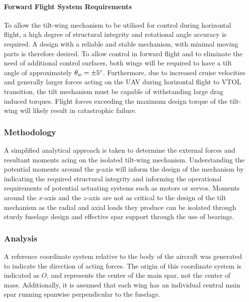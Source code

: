 \paragraph{Forward Flight System Requirements}
To allow the tilt-wing mechanism to be utilised for control during horizontal flight, a high degree of structural integrity and rotational angle accuracy is required. A design with a reliable and stable mechanism, with minimal moving parts is therefore desired. To allow control in forward flight and to eliminate the need of additional control surfaces, both wings will be required to have a tilt angle of approximately \(\theta_w=\pm5\degree\). Furthermore, due to increased cruise velocities and generally larger forces acting on the UAV during horizontal flight to VTOL transition, the tilt mechanism must be capable of withstanding large drag induced torques. Flight forces exceeding the maximum design torque of the tilt-wing will likely result in catastrophic failure. 

\subsubsection{Methodology}
A simplified analytical approach is taken to determine the external forces and resultant moments acing on the isolated tilt-wing mechanism. Understanding the potential moments around the $y$-axis will inform the design of the mechanism by indicating the required structural integrity and informing the operational requirements of potential actuating systems such as motors or servos. Moments around the $x$-axis and the $z$-axis are not as critical to the design of the tilt mechanism as the radial and axial loads they produce can be isolated through sturdy fuselage design and effective spar support through the use of bearings.

\subsubsection{Analysis}
A reference coordinate system relative to the body of the aircraft was generated to indicate the direction of acting forces. The origin of this coordinate system is indicated as $O$, and represents the center of the main spar, not the center of mass. Additionally, it is assumed that each wing has an individual central main spar running spanwise perpendicular to the fuselage. \\

